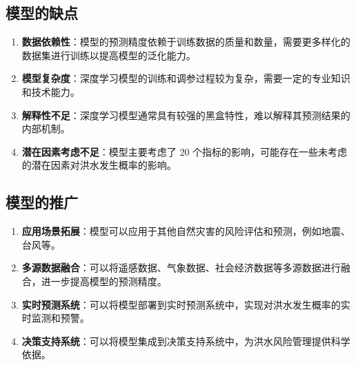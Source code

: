 \documentclass[withoutpreface,bwprint]{cumcmthesis} %
\begin{document}
\subsection{模型的缺点}
\begin{enumerate}
	\item \textbf{数据依赖性}：模型的预测精度依赖于训练数据的质量和数量，需要更多样化的数据集进行训练以提高模型的泛化能力。\cite{bib:two}
	\item \textbf{模型复杂度}：深度学习模型的训练和调参过程较为复杂，需要一定的专业知识和技术能力。
	\item \textbf{解释性不足}：深度学习模型通常具有较强的黑盒特性，难以解释其预测结果的内部机制。
	\item \textbf{潜在因素考虑不足}：模型主要考虑了 20 个指标的影响，可能存在一些未考虑的潜在因素对洪水发生概率的影响。\cite{bib:ten}
\end{enumerate}
\subsection{模型的推广}
\begin{enumerate}
	\item \textbf{应用场景拓展}：模型可以应用于其他自然灾害的风险评估和预测，例如地震、台风等。
	\item \textbf{多源数据融合}：可以将遥感数据、气象数据、社会经济数据等多源数据进行融合，进一步提高模型的预测精度。
	\item \textbf{实时预测系统}：可以将模型部署到实时预测系统中，实现对洪水发生概率的实时监测和预警。
	\item \textbf{决策支持系统}：可以将模型集成到决策支持系统中，为洪水风险管理提供科学依据。\cite{bib:ten}
\end{enumerate}



\end{document}
